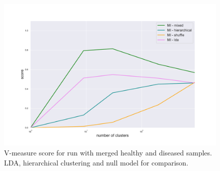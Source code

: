 \begin{figure}[htb!]
    \centering
    \includegraphics[width=0.8\linewidth]{pictures/topic/merged/metric_scores_all.pdf}
    \caption{V-measure score for run with merged healthy and diseased samples. LDA, hierarchical clustering and null model for comparison.}
    \label{fig:topic/merged/metric_scores_all}
\end{figure}

\FloatBarrier
